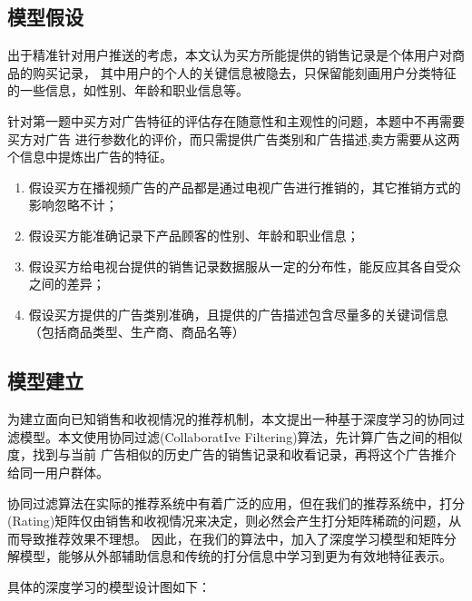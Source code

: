 \subsection{模型假设}

出于精准针对用户推送的考虑，本文认为买方所能提供的销售记录是个体用户对商品的购买记录，
其中用户的个人的关键信息被隐去，只保留能刻画用户分类特征的一些信息，如性别、年龄和职业信息等。

针对第一题中买方对广告特征的评估存在随意性和主观性的问题，本题中不再需要买方对广告
进行参数化的评价，而只需提供广告类别和广告描述,卖方需要从这两个信息中提炼出广告的特征。

\begin{enumerate}[(1)]
    \item 假设买方在播视频广告的产品都是通过电视广告进行推销的，其它推销方式的影响忽略不计；
    \item 假设买方能准确记录下产品顾客的性别、年龄和职业信息；
    \item 假设买方给电视台提供的销售记录数据服从一定的分布性，能反应其各自受众之间的差异；
    \item 假设买方提供的广告类别准确，且提供的广告描述包含尽量多的关键词信息（包括商品类型、生产商、商品名等）
\end{enumerate}

\subsection{模型建立}

为建立面向已知销售和收视情况的推荐机制，本文提出一种基于深度学习的协同过滤模型。本文使用协同过滤(CollaboratIve Filtering)算法，先计算广告之间的相似度，找到与当前
广告相似的历史广告的销售记录和收看记录，再将这个广告推介给同一用户群体。

协同过滤算法在实际的推荐系统中有着广泛的应用，但在我们的推荐系统中，打分(Rating)矩阵仅由销售和收视情况来决定，则必然会产生打分矩阵稀疏的问题，从而导致推荐效果不理想。
因此，在我们的算法中，加入了深度学习模型和矩阵分解模型，能够从外部辅助信息和传统的打分信息中学习到更为有效地特征表示。

具体的深度学习的模型设计图如下：

